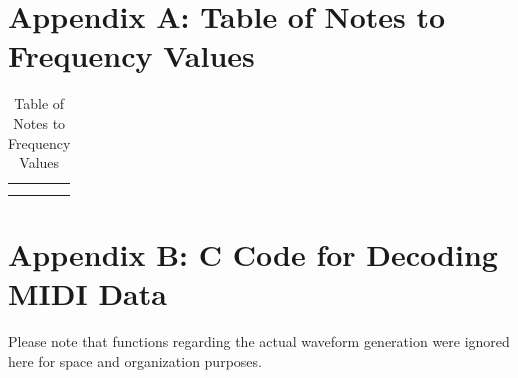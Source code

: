 \documentclass[10pt]{article}
\begin{document}




\appendix

\section{Appendix A: Table of Notes to Frequency Values}\label{Appendix A: Table of Notes to Frequency Values}




\begin{table}[h]
    \centering
    \begin{tabular}{c|c}
         &  \\
         & 
    \end{tabular}
    \caption{Table of Notes to Frequency Values}
    \label{tab:pianonotestofrequency}
\end{table}

\section{Appendix B: C Code for Decoding MIDI Data}

Please note that functions regarding the actual waveform generation were ignored here for space and organization purposes. 
\end{document}
